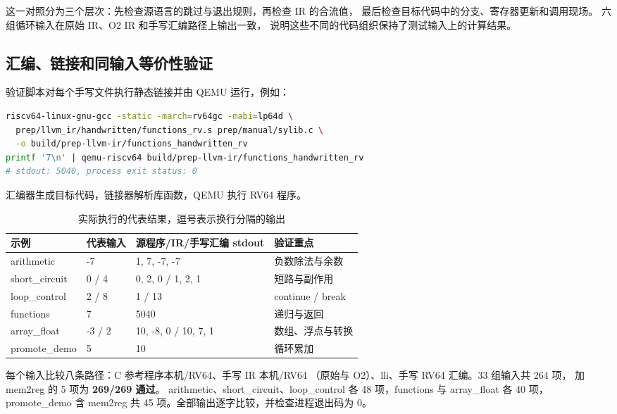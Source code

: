 这一对照分为三个层次：先检查源语言的跳过与退出规则，再检查 IR 的合流值，
最后检查目标代码中的分支、寄存器更新和调用现场。
六组循环输入在原始 IR、O2 IR 和手写汇编路径上输出一致，
说明这些不同的代码组织保持了测试输入上的计算结果。

\subsection{汇编、链接和同输入等价性验证}
验证脚本对每个手写文件执行静态链接并由 QEMU 运行，例如：
\par\vspace{0.7\baselineskip}\noindent\begin{minipage}[t]{\linewidth}
\begin{lstlisting}[language=bash]
riscv64-linux-gnu-gcc -static -march=rv64gc -mabi=lp64d \
  prep/llvm_ir/handwritten/functions_rv.s prep/manual/sylib.c \
  -o build/prep-llvm-ir/functions_handwritten_rv
printf '7\n' | qemu-riscv64 build/prep-llvm-ir/functions_handwritten_rv
# stdout: 5040, process exit status: 0
\end{lstlisting}
\end{minipage}\par\vspace{0.5\baselineskip}
汇编器生成目标代码，链接器解析库函数，QEMU 执行 RV64 程序。

\begin{table}[htbp]
\centering\small
\caption{实际执行的代表结果，逗号表示换行分隔的输出}
\begin{tabular}{llll}
\toprule
示例 & 代表输入 & 源程序/IR/手写汇编 stdout & 验证重点\\
\midrule
arithmetic & -7 & 1, 7, -7, -7 & 负数除法与余数\\
short\_circuit & 0 / 4 & 0, 2, 0 / 1, 2, 1 & 短路与副作用\\
loop\_control & 2 / 8 & 1 / 13 & continue / break\\
functions & 7 & 5040 & 递归与返回\\
array\_float & -3 / 2 & 10, -8, 0 / 10, 7, 1 & 数组、浮点与转换\\
promote\_demo & 5 & 10 & 循环累加\\
\bottomrule
\end{tabular}
\end{table}

每个输入比较八条路径：C 参考程序本机/RV64、手写 IR 本机/RV64
（原始与 O2）、lli、手写 RV64 汇编。33 组输入共 264 项，
加 mem2reg 的 5 项为 \textbf{269/269 通过}。
arithmetic、short\_circuit、loop\_control 各 48 项，functions 与 array\_float 各 40 项，
promote\_demo 含 mem2reg 共 45 项。全部输出逐字比较，并检查进程退出码为 0。
